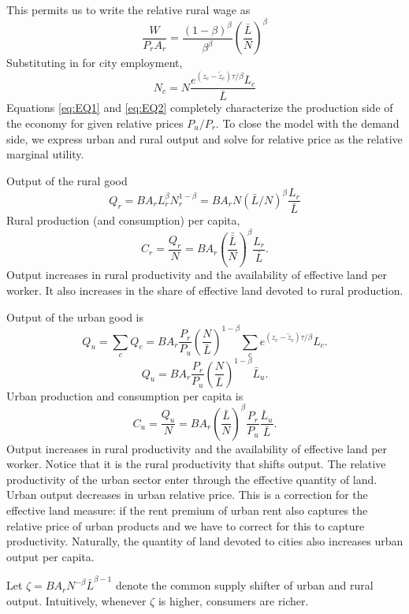 \documentclass[12pt]{article}
\begin{document}
This permits us to write the relative rural wage as
\[
\frac{W}{P_rA_r}
=
	\frac{(1-\beta)^\beta}{\beta^\beta}
\left(
\frac {\bar L}{N}
\right)^{\beta}
\]
Substituting in for city employment,
\begin{equation}\tag{ii}\label{eq:EQ2}
	N_c =  N
\frac {e^{(z_c-\tilde z_c){\tau/\beta}}L_c}
	{{\bar L}}
\end{equation}
Equations \eqref{eq:EQ1} and \eqref{eq:EQ2} completely characterize the production side of the economy for given relative prices $P_u/P_r$. To close the model with the demand side, we express urban and rural output and solve for relative price as the relative marginal utility.

Output of the rural good
\[
Q_r = B A_r L_r^{\beta}N_r^{1-\beta}=
B A_r N ({\bar L}/N)^{\beta}
\frac {L_r}
	{{\bar L}}
\]
Rural production (and consumption) per capita,
\begin{equation}\label{eq:rural_per_capita}
C_r=\frac {Q_r}{N} =
B A_r \left(\frac{\bar{\bar L}}{N}\right)^{\beta}
\frac {L_r}
	{{\bar L}}
.
\end{equation}
Output increases in rural productivity and the availability of effective land per worker. It also increases in the share of effective land devoted to rural production.

Output of the urban good is
\[
Q_u = \sum_c Q_c
= B A_r \frac{P_r}{P_u}
\left(\frac {N}
	{{\bar L}}
\right)^{1-\beta}
\sum_c e^{(z_c-\tilde z_c)\tau/\beta} L_c.
\]
\[
Q_u =  B A_r \frac{P_r}{P_u}
\left(\frac {N}
	{{\bar L}}
\right)^{1-\beta}
\bar L_u.
\]
Urban production and consumption per capita is
\begin{equation}\label{eq:urban_per_capita}
C_u=\frac {Q_u}{N} =
B A_r \left(\frac{{\bar L}}{N}\right)^{\beta}
 \frac{P_r}{P_u}
\frac {\bar L_u}
	{{\bar L}}
.
\end{equation}
Output increases in rural productivity and the availability of effective land per worker. Notice that it is the rural productivity that shifts output. The relative productivity of the urban sector enter through the effective quantity of land. Urban output decreases in urban relative price. This is a correction for the effective land measure: if the rent premium of urban rent also captures the relative price of urban products and we have to correct for this to capture productivity. Naturally, the quantity of land devoted to cities also increases urban output per capita.

Let $\zeta = B A_r N^{-\beta}{{\bar L}}^{\beta-1}$ denote the common supply shifter of urban and rural output. Intuitively, whenever $\zeta$ is higher, consumers are richer.
\end{document}
